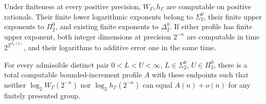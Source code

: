 \begin{theorem}\label{thm:group-ceilings}
Under finiteness at every positive precision, $W_\Gamma,h_\Gamma$ are computable on positive rationals. Their finite lower logarithmic exponents belong to $\Sigma^0_2$, their finite upper exponents to $\Pi^0_2$, and existing finite exponents to $\Delta^0_2$. If either profile has finite upper exponent, both integer dimensions at precision $2^{-n}$ are computable in time $2^{2^{O_\Gamma(n)}}$, and their logarithms to additive error one in the same time.

For every admissible distinct pair $0<L<U<\infty$, $L\in\Sigma^0_2$, $U\in\Pi^0_2$, there is a total computable bounded-increment profile $A$ with these endpoints such that neither $\log_2W_\Gamma(2^{-n})$ nor $\log_2h_\Gamma(2^{-n})$ can equal $A(n)+o(n)$ for any finitely presented group.
\end{theorem}

